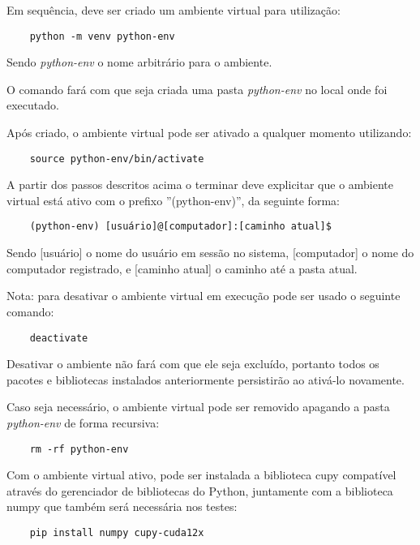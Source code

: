 \documentclass[12pt,a4paper]{article}
\begin{document}
Em sequência, deve ser criado um ambiente virtual para utilização:

\begin{verbatim}
    python -m venv python-env
\end{verbatim}

Sendo \emph{python-env} o nome arbitrário para o ambiente.

O comando fará com que seja criada uma pasta \emph{python-env} no local onde foi executado.

Após criado, o ambiente virtual pode ser ativado a qualquer momento utilizando:

\begin{verbatim}
    source python-env/bin/activate
\end{verbatim}

A partir dos passos descritos acima o terminar deve explicitar que o ambiente virtual está ativo com o prefixo ''(python-env)'', da seguinte forma:

\begin{verbatim}
    (python-env) [usuário]@[computador]:[caminho atual]$
\end{verbatim}

Sendo [usuário] o nome do usuário em sessão no sistema, [computador] o nome do computador registrado, e [caminho atual] o caminho até a pasta atual.

Nota: para desativar o ambiente virtual em execução pode ser usado o seguinte comando:

\begin{verbatim}
    deactivate
\end{verbatim}

Desativar o ambiente não fará com que ele seja excluído, portanto todos os pacotes e bibliotecas instalados anteriormente persistirão ao ativá-lo novamente.

Caso seja necessário, o ambiente virtual pode ser removido apagando a pasta \emph{python-env} de forma recursiva:

\begin{verbatim}
    rm -rf python-env
\end{verbatim}

Com o ambiente virtual ativo, pode ser instalada a biblioteca cupy compatível através do gerenciador de bibliotecas do Python, juntamente com a biblioteca numpy que também será necessária nos testes:

\begin{verbatim}
    pip install numpy cupy-cuda12x
\end{verbatim}
\end{document}
